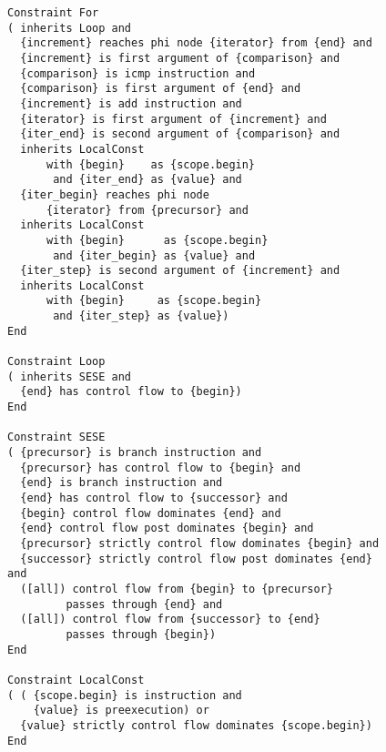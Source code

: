 \begin{figure}[p]
\begin{lstlisting}[language=IDL,basicstyle=\linespread{0.8}\ttfamily,
                   firstnumber=140]
Constraint For
( inherits Loop and
  {increment} reaches phi node {iterator} from {end} and
  {increment} is first argument of {comparison} and
  {comparison} is icmp instruction and
  {comparison} is first argument of {end} and
  {increment} is add instruction and
  {iterator} is first argument of {increment} and
  {iter_end} is second argument of {comparison} and
  inherits LocalConst
      with {begin}    as {scope.begin}
       and {iter_end} as {value} and
  {iter_begin} reaches phi node
      {iterator} from {precursor} and
  inherits LocalConst
      with {begin}      as {scope.begin}
       and {iter_begin} as {value} and
  {iter_step} is second argument of {increment} and
  inherits LocalConst
      with {begin}     as {scope.begin}
       and {iter_step} as {value})
End

Constraint Loop
( inherits SESE and
  {end} has control flow to {begin})
End

Constraint SESE
( {precursor} is branch instruction and
  {precursor} has control flow to {begin} and
  {end} is branch instruction and
  {end} has control flow to {successor} and
  {begin} control flow dominates {end} and
  {end} control flow post dominates {begin} and
  {precursor} strictly control flow dominates {begin} and
  {successor} strictly control flow post dominates {end} and
  ([all]) control flow from {begin} to {precursor}
         passes through {end} and
  ([all]) control flow from {successor} to {end}
         passes through {begin})
End

Constraint LocalConst
( ( {scope.begin} is instruction and
    {value} is preexecution) or
  {value} strictly control flow dominates {scope.begin})
End
\end{lstlisting}
\end{figure}
